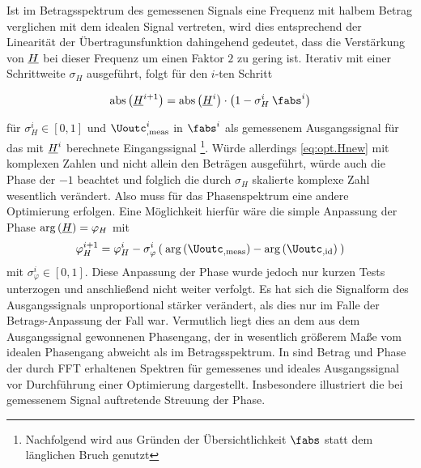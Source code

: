 \documentclass[../Report.tex]{subfiles}
\begin{document}
Ist im Betragsspektrum des gemessenen Signals eine Frequenz mit halbem Betrag verglichen mit dem idealen Signal vertreten, wird dies entsprechend der Linearität der Übertragunsfunktion dahingehend gedeutet, dass die Verstärkung von $\underline{H}$ bei dieser Frequenz um einen Faktor $2$ zu gering ist.
Iterativ mit einer Schrittweite $\sigma_H$ ausgeführt, folgt für den $i$-ten Schritt

\begin{align}
\label{eq:opt.Hnew}
	\mathrm{abs} \left( \Hcompl^{i+1} \right)
		=\mathrm{abs} \left( \Hcompl^{i}  \right) \cdot
		\left( 1 - \sigma_H^i \: \fabs^{i}	\right)					 
\end{align}

für $\sigma_H^i \in \left[ 0 , 1 \right]$ und $\Uoutc_{, \mathrm{meas}}^{i}$ in $\fabs^{i}$ als gemessenem Ausgangssignal für das mit $\underline{H}^{i}$ berechnete Eingangssignal \footnote{Nachfolgend wird aus Gründen der Übersichtlichkeit $\fabs$ statt dem länglichen Bruch genutzt}.
Würde allerdings \eqref{eq:opt.Hnew} mit komplexen Zahlen und nicht allein den Beträgen ausgeführt, würde auch die Phase der $-1$ beachtet und folglich die durch $\sigma_H$ skalierte komplexe Zahl wesentlich verändert. Also muss für das Phasenspektrum eine andere Optimierung erfolgen.
Eine Möglichkeit hierfür wäre die simple Anpassung der Phase $ \mathrm{arg} \left( \underline{H} \right) = \varphi_H$ mit 
\begin{align}
\label{eq:opt.HnewPhase}
	\varphi_H^{i+1} = \varphi_H^{i} - \sigma_{\varphi}^{i} 
			\left( \: \mathrm{arg} \left( \Uoutc_{, \mathrm{meas}} \right)
					- \mathrm{arg} \left( \Uoutc_{, \mathrm{id}} \right) \: \right)
\end{align}
mit $\sigma_{\varphi}^i \in \left[ 0 , 1 \right]$. Diese Anpassung der Phase wurde jedoch nur kurzen Tests unterzogen und anschließend nicht weiter verfolgt. Es hat sich die Signalform des Ausgangssignals unproportional stärker verändert, als dies nur im Falle der Betrags-Anpassung der Fall war. Vermutlich %
liegt dies an dem aus dem Ausgangssignal gewonnenen Phasengang, der in wesentlich größerem Maße vom idealen Phasengang abweicht als im Betragsspektrum. In  sind Betrag und Phase der durch FFT erhaltenen Spektren für gemessenes und ideales Ausgangssignal vor Durchführung einer Optimierung dargestellt. Insbesondere illustriert  die bei gemessenem Signal auftretende Streuung der Phase. 
\\
\end{document}
